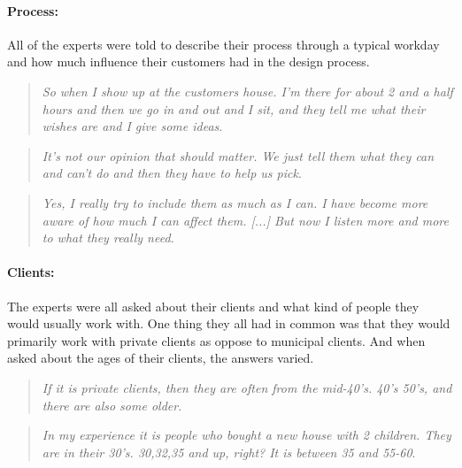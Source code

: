 		\paragraph*{Process:}
		All of the experts were told to describe their process through a typical workday and how  much influence their customers had in the design process.
		\begin{quote}
			\textit{So when I show up at the customers house. I'm there for about 2 and a half hours and then we go in and out and I sit, and they tell me what their wishes are and I give some ideas}\label{quote:expertProcess1}.\\
		\end{quote}
	
		\begin{quote}
			\textit{It's not our opinion that should matter. We just tell them what they can and can't do and then they have to help us pick}\label{quote:expertProcess2}.\\
		\end{quote}
		
		\begin{quote}
			\textit{Yes, I really try to include them as much as I can. I have become more aware of how much I can affect them. [...] But now I listen more and more to what they really need. }\label{quote:expertProcess3}\\
		\end{quote}
		
		
		\paragraph*{Clients:}
		The experts were all asked about their clients and what kind of people they would usually work with. One thing they all had in common was that they would primarily work with private clients as oppose to municipal clients. And when asked about the ages of their clients, the answers varied. 
		
		\begin{quote}
			\textit{If it is private clients, then they are often from the mid-40's. 40’s 50’s, and there are also some older}\label{quote:expertClients1}.\\
		\end{quote}
		
		\begin{quote}
			\textit{In my experience it is people who bought a new house with 2 children. They are in their 30's. 30,32,35 and up, right? It is between 35 and 55-60}\label{quote:expertClients2}.\\
		\end{quote}
	
